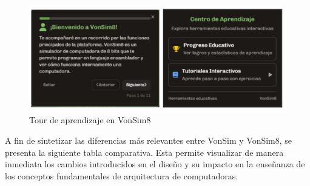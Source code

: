 \documentclass[12pt,oneside]{templates/unerthesis}
\begin{document}
\begin{figure}

{\centering \includegraphics[width=1\linewidth]{images/tour} 

}

\caption{Tour de aprendizaje en VonSim8}\label{fig:tour}
\end{figure}

A fin de sintetizar las diferencias más relevantes entre VonSim y VonSim8, se presenta la siguiente tabla comparativa. Esta permite visualizar de manera inmediata los cambios introducidos en el diseño y su impacto en la enseñanza de los conceptos fundamentales de arquitectura de computadoras.
\end{document}
